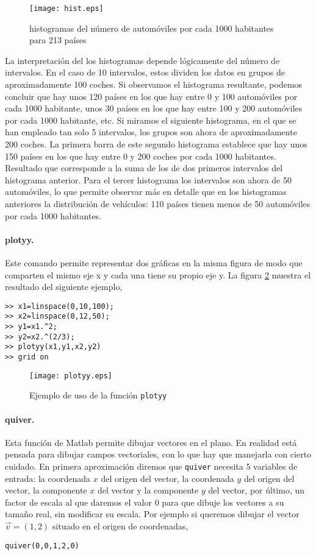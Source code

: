 \begin{figure}[h]
\centering
\texttt{[image: hist.eps]}
\caption{histogramas del número de automóviles por cada 1000 habitantes para 213 países}
\label{fig:hist}
\end{figure}

La interpretación del los histogramas depende lógicamente del número de intervalos. En el caso de 10 intervalos, estos dividen los datos en grupos de aproximadamente 100 coches. Si observamos el histograma resultante, podemos concluir que hay unos 120 países en los que hay entre 0 y 100 automóviles por cada 1000 habitante, unos 30 países en los que hay entre 100 y 200 automóviles por cada 1000 habitante, etc. Si miramos el siguiente histograma, en el que se han empleado tan solo 5 intervalos, los grupos son ahora de aproximadamente 200 coches. La primera barra de este segundo histograma establece que hay unos 150 países en los que hay entre 0 y 200 coches por cada 1000 habitantes. Resultado que corresponde a la suma de los de dos primeros intervalos del histograma anterior. Para el tercer histograma los intervalos son ahora de 50 automóviles, lo que permite observar más en detalle que en los histogramas anteriores la distribución de vehículos: 110 países tienen menos de 50 automóviles por cada 1000 habitantes.

\paragraph{plotyy.} Este comando permite representar dos gráficas en la misma figura de modo que comparten el mismo eje x y cada una tiene su propio eje y. La figura \ref{fig:plotyy} muestra el resultado del siguiente ejemplo,

\begin{verbatim}
>> x1=linspace(0,10,100);
>> x2=linspace(0,12,50);
>> y1=x1.^2;
>> y2=x2.^(2/3);
>> plotyy(x1,y1,x2,y2)
>> grid on
\end{verbatim}

\begin{figure}[h]
\centering
\texttt{[image: plotyy.eps]}
\caption{Ejemplo de uso de la función \texttt{plotyy}}
\label{fig:plotyy}
\end{figure}

\paragraph{quiver.} Esta función de Matlab permite dibujar vectores en el plano. En realidad está pensada para dibujar campos vectoriales, con lo que hay que manejarla con cierto cuidado. En primera aproximación diremos que \texttt{quiver} necesita 5 variables de entrada: la coordenada $x$ del origen del vector, la coordenada $y$ del origen del vector, la componente $x$ del vector y la componente $y$ del vector, por último, un factor de escala al que daremos el valor $0$ para que dibuje los vectores a su tamaño real, sin modificar su escala. Por ejemplo si queremos dibujar el vector $\vec{v}=(1,2)$ situado en el origen de coordenadas,
\begin{verbatim}
quiver(0,0,1,2,0)
\end{verbatim}

